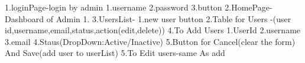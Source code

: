 1.loginPage-login by admin
   1.username
   2.password
   3.button
2.HomePage-Dashboard of Admin
  1.
3.UsersList-
  1.new user button
  2.Table for Users
   -(user id,username,email,status,action(edit,delete))
4.To Add  Users
  1.UserId
  2.username
  3.email
  4.Staus(DropDown:Active/Inactive)
  5.Button for Cancel(clear the form) And Save(add user to userList)
5.To Edit users-same As add